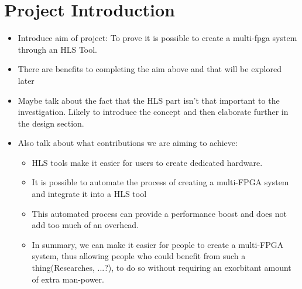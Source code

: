 \chapter{Project Introduction}

\begin{itemize}
    \item Introduce aim of project: To prove it is possible to create a multi-fpga system through an HLS Tool.
    \item There are benefits to completing the aim above and that will be explored later
    \item Maybe talk about the fact that the HLS part isn't that important to the investigation. Likely to introduce the concept and then elaborate further in the design section.
    \item Also talk about what contributions we are aiming to achieve:
    \begin{itemize}
        \item HLS tools make it easier for users to create dedicated hardware.
        \item It is possible to automate the process of creating a multi-FPGA system and integrate it into a HLS tool
        \item This automated process can provide a performance boost and does not add too much of an overhead.
        \item In summary, we can make it easier for people to create a multi-FPGA system, thus allowing people who could benefit from such a thing(Researches, ...?), to do so without requiring an exorbitant amount of extra man-power.
    \end{itemize}
\end{itemize}